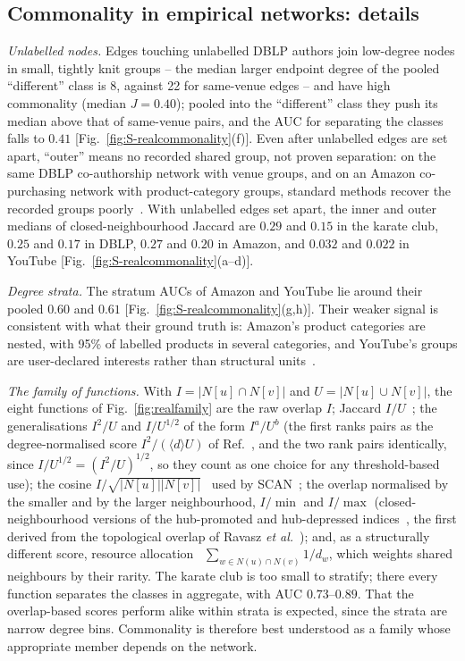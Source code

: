 \subsection*{Commonality in empirical networks: details}

\emph{Unlabelled nodes.} Edges touching unlabelled DBLP authors join low-degree nodes in
small, tightly knit groups -- the median larger endpoint degree of the pooled
``different'' class is 8, against 22 for same-venue edges -- and have high commonality
(median $J=0.40$); pooled into the ``different'' class they push its median above that
of same-venue pairs, and the AUC for separating the classes falls to $0.41$
[Fig.~\ref{fig:S-realcommonality}(f)]. Even after unlabelled edges are set apart,
``outer'' means no recorded shared group, not proven separation: on the same DBLP
co-authorship network with venue groups, and on an Amazon co-purchasing network with
product-category groups, standard methods recover the recorded groups
poorly~\cite{hric2014community}. With unlabelled edges set apart, the inner and outer
medians of closed-neighbourhood Jaccard are $0.29$ and $0.15$ in the karate club, $0.25$
and $0.17$ in DBLP, $0.27$ and $0.20$ in Amazon, and $0.032$ and $0.022$ in YouTube
[Fig.~\ref{fig:S-realcommonality}(a--d)].

\emph{Degree strata.} The stratum AUCs of Amazon and YouTube lie around their pooled
$0.60$ and $0.61$ [Fig.~\ref{fig:S-realcommonality}(g,h)]. Their weaker signal is
consistent with what their ground truth is: Amazon's product categories are nested, with
95\% of labelled products in several categories, and YouTube's groups are user-declared
interests rather than structural units~\cite{yang2015defining}.

\emph{The family of functions.} With $I=|N[u]\cap N[v]|$ and $U=|N[u]\cup N[v]|$, the
eight functions of Fig.~\ref{fig:realfamily} are the raw overlap $I$; Jaccard
$I/U$~\cite{jaccard1912distribution}; the generalisations $I^2/U$ and $I/U^{1/2}$ of the
form $I^a/U^b$ (the first ranks pairs as the degree-normalised score
$I^2/(\langle d\rangle U)$ of Ref.~\cite{deinega2023thesis}, and the two rank pairs
identically, since $I/U^{1/2}=(I^2/U)^{1/2}$, so they count as one choice for any
threshold-based use); the cosine $I/\sqrt{|N[u]||N[v]|}$~\cite{salton1983introduction}
used by SCAN~\cite{xu2007scan}; the overlap normalised by the smaller and by the larger
neighbourhood, $I/\min$ and $I/\max$ (closed-neighbourhood versions of the hub-promoted
and hub-depressed indices~\cite{zhou2009predicting,lu2011link}, the first derived from
the topological overlap of Ravasz \emph{et al.}~\cite{ravasz2002hierarchical}); and, as a
structurally different score, resource allocation~\cite{zhou2009predicting}
$\sum_{w\in N(u)\cap N(v)}1/d_w$, which weights shared neighbours by their rarity. The
karate club is too small to stratify; there every function separates the classes in
aggregate, with AUC $0.73$--$0.89$. That the overlap-based scores perform alike within
strata is expected, since the strata are narrow degree bins. Commonality is therefore
best understood as a family whose appropriate member depends on the network.

